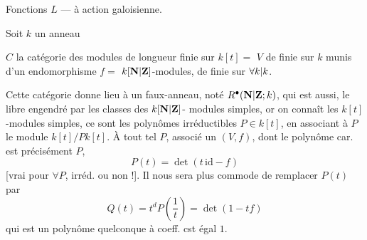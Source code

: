 \qquad Fonctions $L$ ---  à
\hfill action galoisienne.

Soit $k$ un  anneau

$C$ la catégorie des modules de longueur
finie sur $k[t]=$  $V$ 
de  finie sur
$k$ munis d'un endomorphisme $f=$
$k[\mathbf N|\mathbf Z]$-modules, de  finie sur $\forall k|k$.

Cette catégorie donne lieu à un faux-anneau,
noté $R^\bullet(\mathbf N|\mathbf Z;k)$, qui est aussi, 
le  
libre engendré par les classes des $k[\mathbf N|\mathbf Z]$-
modules simples,  or on connaît les $k[t]$-modules
simples, ce sont les polynômes  irréductibles
$P\in k[t]$, en associant à $P$ le module
$k[t]/Pk[t]$. À tout tel $P$,  associé 
un $(V,f)$, dont le polynôme car. est
précisément $P$,
\[
P(t)=\det(t\,\mathrm{id}-f)
\]
[vrai pour $\forall P$, irréd. ou non !]. Il nous sera
plus commode de remplacer $P(t)$ par
\[
Q(t)=t^dP\left(\frac1t\right)=\det(1-tf)
\]
qui est un polynôme quelconque à coeff. cst égal $1$.
